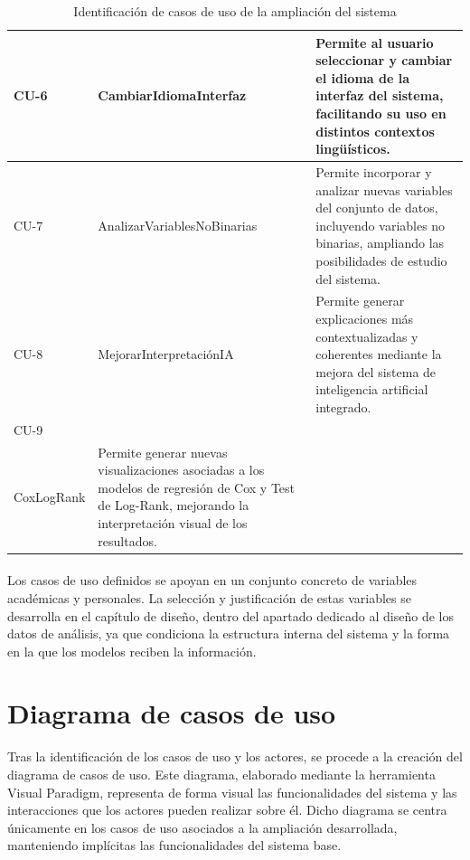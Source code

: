 \begin{table}[H]
\begin{tabularx}{\textwidth}{|p{1.1cm}|>{\raggedright\arraybackslash}p{4.9cm}|X|}
CU-6 & CambiarIdiomaInterfaz & 
Permite al usuario seleccionar y cambiar el idioma de la interfaz del sistema, facilitando su uso en distintos contextos lingüísticos. \\ \hline

CU-7 & AnalizarVariablesNoBinarias & 
Permite incorporar y analizar nuevas variables del conjunto de datos, incluyendo variables no binarias, ampliando las posibilidades de estudio del sistema. \\ \hline

CU-8 & MejorarInterpretaciónIA & 
Permite generar explicaciones más contextualizadas y coherentes mediante la mejora del sistema de inteligencia artificial integrado. \\ \hline

CU-9 & \begin{tabular}[t]{@{}l@{}}AmpliarVisualizaciones\\CoxLogRank\end{tabular} & 
Permite generar nuevas visualizaciones asociadas a los modelos de regresión de Cox y Test de Log-Rank, mejorando la interpretación visual de los resultados. \\ \hline

\end{tabularx}
\caption{Identificación de casos de uso de la ampliación del sistema}
\label{tab:casos_uso_ampliacion}
\normalsize
\end{table}

\paragraph*{}Los casos de uso definidos se apoyan en un conjunto concreto de variables académicas y personales. La selección y justificación de estas variables se desarrolla en el capítulo de diseño, dentro del apartado dedicado al diseño de los datos de análisis, ya que condiciona la estructura interna del sistema y la forma en la que los modelos reciben la información.



\section{Diagrama de casos de uso}
Tras la identificación de los casos de uso y los actores, se procede a la creación del diagrama de casos de uso. Este diagrama, elaborado mediante la herramienta Visual Paradigm, representa de forma visual las funcionalidades del sistema y las interacciones que los actores pueden realizar sobre él.
Dicho diagrama se centra únicamente en los casos de uso asociados a la ampliación desarrollada, manteniendo implícitas las funcionalidades del sistema base. 


